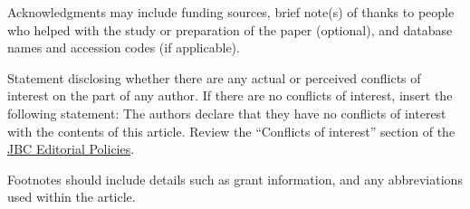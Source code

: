 \documentclass[alpha-refs]{wiley-article}
\begin{document}
\begin{acknowledgments}
Acknowledgments may include funding sources, brief note(s) of thanks to people who helped with the study or preparation of the paper (optional), and database names and accession codes (if applicable). 
\end{acknowledgments}

\begin{conflict}
Statement disclosing whether there are any actual or perceived conflicts of interest on the part of any author. If there are no conflicts of interest, insert the following statement: The authors declare that they have no conflicts of interest with the contents of this article. Review the “Conflicts of interest” section of the \href{http://www.jbc.org/site/misc/edpolicy.xhtml}{JBC Editorial Policies}.
\end{conflict}




\begin{footnotes}
Footnotes should include details such as grant information, and any abbreviations used within the article.
\end{footnotes}
\end{document}
